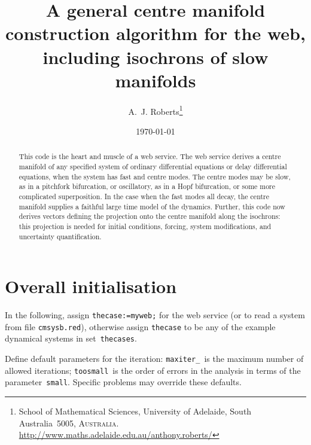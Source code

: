 \documentclass[11pt,a5paper]{article}
\title{A general centre manifold construction algorithm for the web, including isochrons of slow manifolds}
\author{A.~J. Roberts\thanks{School of Mathematical Sciences, University of Adelaide, South Australia~5005, \textsc{Australia}.
\url{http://www.maths.adelaide.edu.au/anthony.roberts/}}}
\date{\today}
\begin{document}
\maketitle

\begin{abstract}
This code is the heart and muscle of a web service.
The web service derives a centre manifold of any specified system of ordinary differential equations or delay differential equations, when the system has fast and centre modes. 
The centre modes may be slow, as in a pitchfork bifurcation, or oscillatory, as in a Hopf bifurcation, or some more complicated superposition. 
In the case when the fast modes all decay, the centre manifold supplies a faithful large time model of the dynamics. 
Further, this code now derives vectors defining the projection onto the centre manifold along the isochrons: this projection is needed for initial conditions, forcing, system modifications, and uncertainty quantification.
\end{abstract}

\tableofcontents

\section{Overall initialisation}

In the following, assign \verb|thecase:=myweb;| for the web service (or to read a system from file \verb|cmsysb.red|), otherwise assign \verb|thecase| to be any of the example dynamical systems in set~\verb|thecases|.

Define default parameters for the iteration:
\verb|maxiter_|~is the maximum number of allowed iterations;
\verb|toosmall|~is the order of errors in the analysis in terms of the parameter~\verb|small|.
Specific problems may override these defaults.
\end{document}
